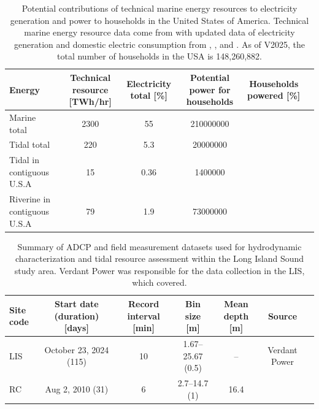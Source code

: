 \documentclass[12pt,sort&compress]{elsarticle}
\theoremstyle{definition}%
\begin{document}
\begin{table}[h!]
\centering
\caption{Potential contributions of technical marine energy resources to electricity generation and power to households in the United States of America. Technical marine energy resource data come from \citet{nrel_2021} with updated data of electricity generation and domestic electric consumption from \citet{owid_energy_united_states}, \citet{uscensus_household}, and \citet{eia_electricdomestic}. As of V2025, the total number of households in the USA is 148,260,882.}

\label{tab:data_summary}
\begin{tabular}{lccccc}
\hline
\textbf{Energy} & \textbf{Technical resource [TWh/hr]} & \textbf{Electricity total [\%]} & \textbf{Potential power for households} & \textbf{Households powered [\%]}\\
\hline
Marine total & 2300 & 55 & 210000000 &  \\
Tidal total & 220 & 5.3 & 20000000 &  \\
Tidal in contiguous U.S.A & 15 & 0.36 & 1400000 &  \\
Riverine in contiguous U.S.A & 79 & 1.9 & 73000000 &  \\
\hline
\end{tabular}
\end{table}


\begin{table}[h!]
\centering
\caption{Summary of ADCP and field measurement datasets used for hydrodynamic characterization and tidal resource assessment within the Long Island Sound study area. Verdant Power was responsible for the data collection in the LIS, which \cite{husoVP2026} covered.}
\label{tab:data_summary}
\begin{tabular}{lcccccc}
\hline
\textbf{Site code} & \textbf{Start date (duration) [days]} & \textbf{Record interval [min]} & \textbf{Bin size [m]} & \textbf{Mean depth [m]} & \textbf{Source} \\
\hline
LIS & October 23, 2024 (115) & 10 & 1.67--25.67 (0.5) & -- & Verdant Power \\
RC & Aug 2, 2010 (31) & 6 & 2.7--14.7 (1) & 16.4 & \cite{37} \\
\hline
\end{tabular}
\end{table}
\end{document}
